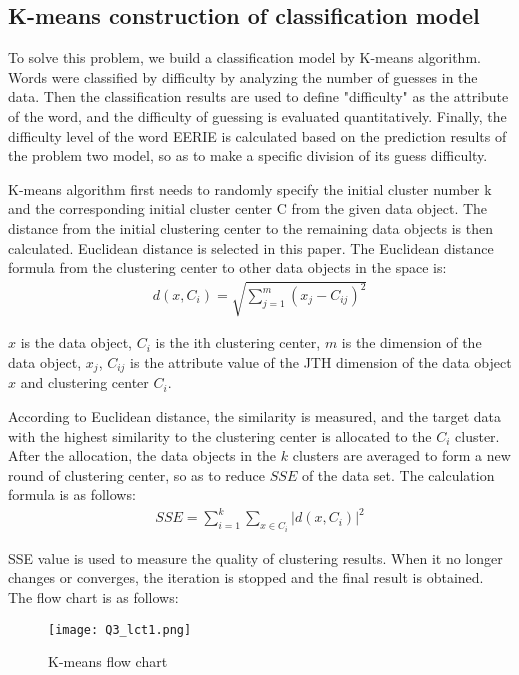 \documentclass{mcmthesis}
\begin{document}
\subsection{K-means construction of classification model}
To solve this problem, we build a classification model by K-means algorithm. Words were classified by difficulty by analyzing the number of guesses in the data. Then the classification results are used to define "difficulty" as the attribute of the word, and the difficulty of guessing is evaluated quantitatively. Finally, the difficulty level of the word EERIE is calculated based on the prediction results of the problem two model, so as to make a specific division of its guess difficulty.


K-means algorithm first needs to randomly specify the initial cluster number k and the corresponding initial cluster center C from the given data object. The distance from the initial clustering center to the remaining data objects is then calculated. Euclidean distance is selected in this paper. The Euclidean distance formula from the clustering center to other data objects in the space is:
\begin{eqnarray}
	d\left(x, C_{i}\right) = \sqrt{\sum_{j  = 1}^{m}\left(x_{j}-C_{i j}\right)^{2}}
\end{eqnarray}

$x$ is the data object, $C_i$ is the ith clustering center, $m$ is the dimension of the data object, $x_j$, $C_{ij}$ is the attribute value of the JTH dimension of the data object $x$ and clustering center $C_i$.

According to Euclidean distance, the similarity is measured, and the target data with the highest similarity to the clustering center is allocated to the $C_i$ cluster. After the allocation, the data objects in the $k$ clusters are averaged to form a new round of clustering center, so as to reduce $SSE$ of the data set. The calculation formula is as follows:
\begin{eqnarray}
	S S E=\sum_{i=1}^{k} \sum_{x \in C_{i}}\left|d\left(x, C_{i}\right)\right|^{2}
\end{eqnarray}

SSE value is used to measure the quality of clustering results. When it no longer changes or converges, the iteration is stopped and the final result is obtained. The flow chart is as follows:
\begin{figure}[H]
	\centering
	\texttt{[image: Q3\_lct1.png]}
	\caption{\small K-means flow chart}
\end{figure}
\end{document}

